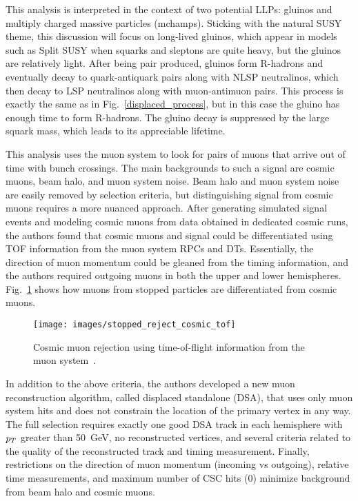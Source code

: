 \documentclass[12pt]{article}
\begin{document}
        This analysis is interpreted in the context of two potential LLPs: gluinos and multiply charged massive particles (mchamps). Sticking with the natural SUSY theme, this discussion will focus on long-lived gluinos, which appear in models such as Split SUSY when squarks and sleptons are quite heavy, but the gluinos are relatively light. After being pair produced, gluinos form R-hadrons and eventually decay to quark-antiquark pairs along with NLSP neutralinos, which then decay to LSP neutralinos along with muon-antimuon pairs. This process is exactly the same as in Fig.~\ref{displaced_process}, but in this case the gluino has enough time to form R-hadrons. The gluino decay is suppressed by the large squark mass, which leads to its appreciable lifetime.

        This analysis uses the muon system to look for pairs of muons that arrive out of time with bunch crossings. The main backgrounds to such a signal are cosmic muons, beam halo, and muon system noise. Beam halo and muon system noise are easily removed by selection criteria, but distinguishing signal from cosmic muons requires a more nuanced approach. After generating simulated signal events and modeling cosmic muons from data obtained in dedicated cosmic runs, the authors found that cosmic muons and signal could be differentiated using TOF information from the muon system RPCs and DTs. Essentially, the direction of muon momentum could be gleaned from the timing information, and the authors required outgoing muons in both the upper and lower hemispheres. Fig.~\ref{stopped_muon_differentiation} shows how muons from stopped particles are differentiated from cosmic muons.
        
        \noindent \begin{figure}[htbp] \begin{center}
        \texttt{[image: images/stopped\_reject\_cosmic\_tof]}
        \caption{Cosmic muon rejection using time-of-flight information from the muon system~\cite{cms_stopped}.}
        \label{stopped_muon_differentiation}
        \end{center} \end{figure}

        In addition to the above criteria, the authors developed a new muon reconstruction algorithm, called displaced standalone (DSA), that uses only muon system hits and does not constrain the location of the primary vertex in any way. The full selection requires exactly one good DSA track in each hemisphere with $p_T$ greater than \SI{50}{\giga\electronvolt}, no reconstructed vertices, and several criteria related to the quality of the reconstructed track and timing measurement. Finally, restrictions on the direction of muon momentum (incoming vs outgoing), relative time measurements, and maximum number of CSC hits (0) minimize background from beam halo and cosmic muons.
\end{document}
